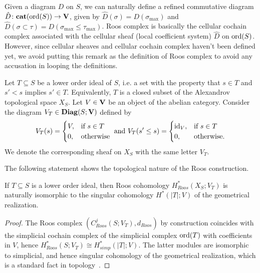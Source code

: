 \begin{rem}\label{remRefinedDiagram}
Given a diagram $D$ on $S$, we can naturally define a refined commutative diagram $\hat{D}\colon\mathbf{cat}(\operatorname{ord}(S))\to \mathbf{V}$, given by $\hat{D}(\sigma)=D(\sigma_{\max})$ and $\hat{D}(\sigma\subset\tau)=D(\sigma_{\max}\leq\tau_{\max})$. Roos complex is basically the cellular cochain complex associated with the cellular sheaf (local coefficient system) $\hat{D}$ on $\operatorname{ord}(S)$. However, since cellular sheaves and cellular cochain complex haven't been defined yet, we avoid putting this remark as the definition of Roos complex to avoid any accusation in looping the definitions.
\end{rem}

\begin{con}\label{conConstantSheafOnLowerIdeal}
Let $T\subseteq S$ be a lower order ideal of $S$, i.e. a set with the property that $s\in T$ and $s'<s$ implies $s'\in T$. Equivalently, $T$ is a closed subset of the Alexandrov topological space $X_S$. Let $V\in\mathbf{V}$ be an object of the abelian category. Consider the diagram $V_T\in \mathbf{Diag}(S;\mathbf{V})$ defined by
\[
V_T(s)=\begin{cases}
         V, & \mbox{if } s\in T \\
         0, & \mbox{otherwise}
       \end{cases}\mbox{ and }
       V_T(s'\leq s) =\begin{cases}
         \operatorname{id}_V, & \mbox{if } s\in T \\
         0, & \mbox{otherwise}.
       \end{cases}
\]
We denote the corresponding sheaf on $X_S$ with the same letter $V_T$.
\end{con}

The following statement shows the topological nature of the Roos construction. %

\begin{prop}\label{propRoosIsSingular}
If $T\subseteq S$ is a lower order ideal, then Roos cohomology $H^*_{Roos}(X_S;V_T)$ is naturally isomorphic to the singular cohomology $H^*(|T|;V)$ of the geometrical realization.
\end{prop}

\begin{proof}
The Roos complex $(C^j_{Roos}(S;V_T),d_{Roos})$ by construction coincides with the simplicial cochain complex of the simplicial complex $\operatorname{ord}(T)$ with coefficients in $V$, hence $H^*_{Roos}(S;V_T)\cong H^*_{simp}(|T|;V)$. The latter modules are isomorphic to simplicial, and hence singular cohomology of the geometrical realization, which is a standard fact in topology~\cite[Thm.2.27]{Hatcher}. %
\end{proof}

